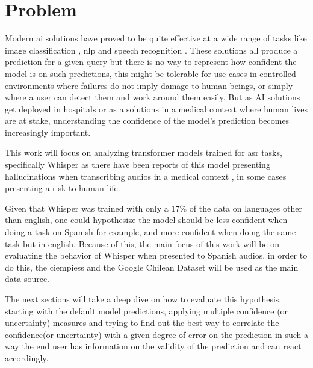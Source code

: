 \newpage

\section{Problem}
\label{chapter:introduction:section:problem}


Modern \acrfull{ai} solutions have proved to be quite effective at a wide range of tasks like image classification \cite{srivastava2024omnivec}\cite{foret2020sharpness}, \acrfull{nlp} \cite{brown2020language}\cite{budagam2024hierarchical} and speech recognition \cite{ma2023auto}\cite{hwang2024fadam}. These solutions all produce a prediction for a given query but there is no way to represent how confident the model is on such predictions, this might be  tolerable for use cases in controlled environments where failures do not imply damage to human beings, or simply where a user can detect them and work around them easily. But as AI solutions get deployed in hospitals or as a solutions in a medical context\cite{klumpp2021artificial} where human lives are at stake, understanding the confidence of the model's prediction becomes increasingly important.

This work will focus on analyzing transformer models trained for \acrfull{asr} tasks, specifically Whisper\cite{radford2023robust} as there have been reports of this model presenting hallucinations when transcribing audios in a medical context \cite{koenecke2024careless}, in some cases presenting a risk to human life.

Given that Whisper was trained with only a $17\%$ of the data on languages other than english\cite{radford2023robust}, one could hypothesize the model should be less confident when doing a task on Spanish for example, and more confident when doing the same task but in english. Because of this, the main focus of this work will be on evaluating the behavior of Whisper when presented to Spanish audios, in order to do this, the \acrfull{ciempiess}\cite{hernandez2017automatic} and the Google Chilean Dataset \cite{guevara-rukoz-etal-2020-crowdsourcing} will be used as the main data source.


The next sections will take a deep dive on how to evaluate this hypothesis, starting with the default model predictions, applying multiple confidence (or uncertainty) measures \cite{gal2016dropout}\cite{hinton2015distilling}\cite{calderon2022dealing} and trying to find out the best way to correlate the confidence(or uncertainty) with a given degree of error on the prediction\cite{guo2017calibration} in such a way the end user has information on the validity of the prediction and can react accordingly.

